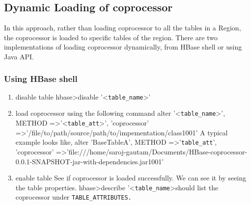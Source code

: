 \documentclass[11pt,a4paper,bibtotoc,idxtotoc,headsepline,footsepline,footexclude,BCOR12mm,DIV13]{scrbook}
\begin{document}
\subsection{Dynamic Loading of coprocessor}
In this approach, rather than loading coprocessor to all the tables in a Region, the coprocessor is loaded to specific tables of the region. There are two implementations of loading coprocessor dynamically, from HBase shell or using Java API\cite{hbase:site}.

\subsubsection{Using HBase shell}
\begin{enumerate}
	\item disable table \newline
			\space \space hbase\textgreater disable '\textless \texttt{table\_name}\textgreater'
	\item load coprocessor using the following command \newline
	alter '\textless \texttt{table\_name}\textgreater', \newline 
	METHOD =\textgreater '\textless \texttt{table\_att}\textgreater', 'coprocessor' =\textgreater '/file/to/path\text{\textbar}\newline/source/path/to/impementation/class\text{\textbar}1001\text{\textbar}'
	\newline \newline
	A typical example looks like,\newline \newline
	alter 'BaseTableA', METHOD =\textgreater '\texttt{table\_att}', 'coprocessor' =\textgreater 'file:///home/saroj-gautam/Documents/HBase-coprocessor-0.0.1-SNAPSHOT-jar-with-dependencies.jar\text{\textbar}\texttt {}\text{\textbar}1001\text{\textbar}'
	
	\item enable table \newline
	See if coprocessor is loaded successfully. We can see it by seeing the table properties. \newline 
	hbase\textgreater describe '\textless \texttt{table\_name}\textgreater \space should list the coprocessor under \texttt{TABLE\_ATTRIBUTES.} \newline

\end{enumerate}
\end{document}
